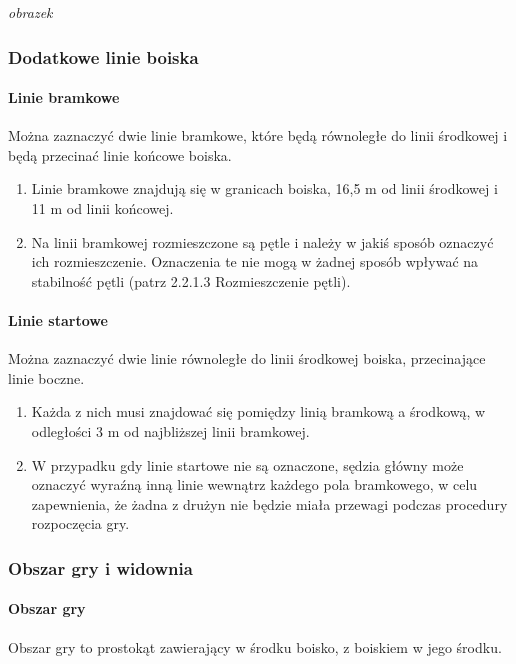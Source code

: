 \documentclass[12pt]{article}
\begin{document}
\textit{obrazek}

\subsubsection{Dodatkowe linie boiska}

\paragraph{Linie bramkowe}
Można zaznaczyć dwie linie
bramkowe, które będą równoległe do linii środkowej i będą przecinać
linie końcowe boiska.

\begin{enumerate}
\item Linie bramkowe znajdują się w granicach boiska, 16,5 m od linii
środkowej i 11 m od linii końcowej.

\item Na linii bramkowej rozmieszczone są pętle i należy w jakiś sposób
oznaczyć ich rozmieszczenie. Oznaczenia te nie mogą w żadnej sposób
wpływać na stabilność pętli (patrz 2.2.1.3 Rozmieszczenie pętli).
\end{enumerate}

\paragraph{Linie startowe}
Można zaznaczyć dwie linie równoległe
do linii środkowej boiska, przecinające linie boczne.

\begin{enumerate}
\item Każda z nich musi znajdować się pomiędzy linią bramkową a środkową, w
  odległości 3 m od najbliższej linii bramkowej.
\item W przypadku gdy linie startowe nie są oznaczone, sędzia główny może
  oznaczyć wyraźną inną linie wewnątrz każdego pola bramkowego, w celu
  zapewnienia, że żadna z drużyn nie będzie miała przewagi podczas
  procedury rozpoczęcia gry.
\end{enumerate}

\subsubsection{Obszar gry i widownia}

\paragraph{Obszar gry}
Obszar gry to prostokąt zawierający w
środku boisko, z boiskiem w jego środku.
\end{document}
